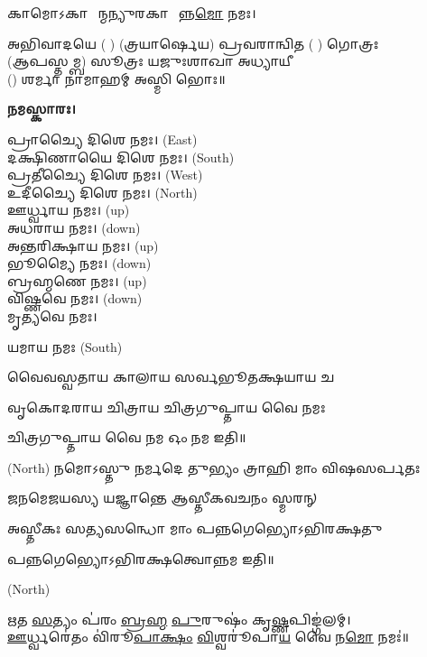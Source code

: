 𑌕𑌾𑌮𑍋𑌽𑌕𑌾𑌰𑍍\mbox{}𑌷𑍀᳚𑌨𑍍𑌮𑌨𑍍𑌯𑍁𑌰𑌕𑌾𑌰𑍍\mbox{}𑌷𑍀᳚𑌨𑍍𑌨\ul{𑌮𑍋} 𑌨𑌮𑌃।

𑌅𑌭𑌿𑌵𑌾𑌦𑌯𑍇 ( ) (𑌤𑍍𑌰𑌯𑌾𑌰𑍍𑌷𑍇𑌯) 𑌪𑍍𑌰𑌵𑌰𑌾𑌨𑍍𑌵𑌿𑌤 ( ) 𑌗𑍋𑌤𑍍𑌰𑌃\\
(𑌆𑌪𑌸𑍍𑌤𑌮𑍍𑌬) 𑌸𑍂𑌤𑍍𑌰𑌃 𑌯𑌜𑍁𑌃𑌶𑌾𑌖𑌾 𑌅𑌧𑍍𑌯𑌾𑌯𑍀\\
() 𑌶𑌰𑍍𑌮𑌾 𑌨𑌾𑌮𑌾𑌹𑌮𑍍 𑌅𑌸𑍍𑌮𑌿 𑌭𑍋𑌃॥

\textbf{𑌨𑌮𑌸𑍍𑌕𑌾𑌰𑌃।}


𑌪𑍍𑌰𑌾𑌚𑍍𑌯𑍈 𑌦𑌿𑌶𑍇 𑌨𑌮𑌃।   {\scriptsize (East)}\\
𑌦𑌕𑍍𑌷𑌿𑌣𑌾𑌯𑍈 𑌦𑌿𑌶𑍇 𑌨𑌮𑌃।  {\scriptsize (South)}\\
𑌪𑍍𑌰𑌤𑍀𑌚𑍍𑌯𑍈 𑌦𑌿𑌶𑍇 𑌨𑌮𑌃।   {\scriptsize (West)}\\
𑌉𑌦𑍀𑌚𑍍𑌯𑍈 𑌦𑌿𑌶𑍇 𑌨𑌮𑌃।   {\scriptsize (North)}\\
𑌊𑌰𑍍𑌧𑍍𑌵𑌾𑌯 𑌨𑌮𑌃।   {\scriptsize (up)}\\
𑌅𑌧𑌰𑌾𑌯 𑌨𑌮𑌃।   {\scriptsize (down)}\\
𑌅𑌨𑍍𑌤𑌰𑌿𑌕𑍍𑌷𑌾𑌯 𑌨𑌮𑌃। {\scriptsize (up)}\\
𑌭𑍂𑌮𑍍𑌯𑍈 𑌨𑌮𑌃। {\scriptsize (down)}\\
𑌬𑍍𑌰𑌹𑍍𑌮𑌣𑍇 𑌨𑌮𑌃। {\scriptsize (up)}\\
𑌵𑌿𑌷𑍍𑌣𑌵𑍇 𑌨𑌮𑌃।  {\scriptsize (down)}\\
𑌮𑍃𑌤𑍍𑌯𑌵𑍇 𑌨𑌮𑌃।

𑌯𑌮𑌾𑌯 𑌨𑌮𑌃   {\scriptsize (South)}

{𑌵𑍈𑌵𑌸𑍍𑌵𑌤𑌾𑌯   𑌕𑌾𑌲𑌾𑌯   𑌸𑌰𑍍𑌵𑌭𑍂𑌤𑌕𑍍𑌷𑌯𑌾𑌯   𑌚}

{𑌵𑍃𑌕𑍋𑌦𑌰𑌾𑌯   𑌚𑌿𑌤𑍍𑌰𑌾𑌯   𑌚𑌿𑌤𑍍𑌰𑌗𑍁𑌪𑍍𑌤𑌾𑌯   𑌵𑍈  𑌨𑌮𑌃}

𑌚𑌿𑌤𑍍𑌰𑌗𑍁𑌪𑍍𑌤𑌾𑌯   𑌵𑍈  𑌨𑌮 𑌓𑌂 𑌨𑌮 𑌇𑌤𑌿॥

 {\scriptsize (North)}
{𑌨𑌮𑍋𑌽𑌸𑍍𑌤𑍁 𑌨𑌰𑍍𑌮𑌦𑍇 𑌤𑍁𑌭𑍍𑌯𑌂 𑌤𑍍𑌰𑌾𑌹𑌿 𑌮𑌾𑌂 𑌵𑌿𑌷𑌸𑌰𑍍𑌪𑌤𑌃}

{𑌜𑌨𑌮𑍇𑌜𑌯𑌸𑍍𑌯 𑌯𑌜𑍍𑌞𑌾𑌨𑍍𑌤𑍇 𑌆𑌸𑍍𑌤𑍀𑌕𑌵𑌚𑌨𑌂 𑌸𑍍𑌮𑌰𑌨𑍍}


{𑌅𑌸𑍍𑌤𑍀𑌕𑌃 𑌸𑌤𑍍𑌯𑌸𑌨𑍍𑌧𑍋 𑌮𑌾𑌂 𑌪𑌨𑍍𑌨𑌗𑍇𑌭𑍍𑌯𑍋𑌽𑌭𑌿𑌰𑌕𑍍𑌷𑌤𑍁}

𑌪𑌨𑍍𑌨𑌗𑍇𑌭𑍍𑌯𑍋𑌽𑌭𑌿𑌰𑌕𑍍𑌷𑌤𑍍𑌵𑍋𑌨𑍍𑌨𑌮 𑌇𑌤𑌿॥

 {\scriptsize (North)}

\ul{𑌋}𑌤 \ul{𑌸}𑌤𑍍𑌯𑌂 𑌪॑𑌰𑌂 \ul{𑌬𑍍𑌰}\ul{𑌹𑍍𑌮} \ul{𑌪𑍁}𑌰𑍁𑌷𑌂॑ 𑌕𑍃\ul{𑌷𑍍𑌣}𑌪𑌿𑌙𑍍𑌗॑𑌲𑌮𑍍।\\
\ul{𑌊}𑌰𑍍𑌧𑍍𑌵𑌰𑍇॑𑌤𑌂 𑌵𑌿॑𑌰𑍂\ul{𑌪𑌾}\ul{𑌕𑍍𑌷𑌂} \ul{𑌵𑌿}𑌶𑍍𑌵𑌰𑍂॑𑌪𑌾\ul{𑌯} 𑌵𑍈 𑌨\ul{𑌮𑍋} 𑌨𑌮𑌃॑॥



